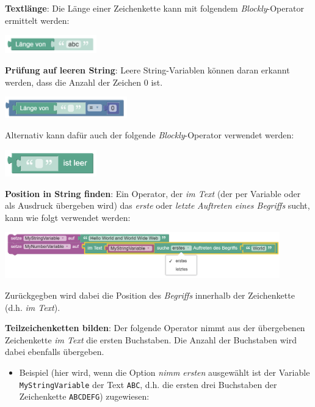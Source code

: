 \documentclass[
  letterpaper,
  DIV=11]{scrreprt}
\providecommand{\tightlist}{%
  \setlength{\itemsep}{0pt}\setlength{\parskip}{0pt}}\usepackage{longtable,booktabs,array}
\begin{document}
\begin{tcolorbox}
\textbf{Textlänge}: Die Länge einer Zeichenkette kann mit folgendem
\emph{Blockly}-Operator ermittelt werden:

\includegraphics[width=1.5625in,height=\textheight]{img/screenshot-blockly-text-length-operator-empty-01-DEU.png}

\textbf{Prüfung auf leeren String}: Leere String-Variablen können daran
erkannt werden, dass die Anzahl der Zeichen \(0\) ist.

\includegraphics[width=2.08333in,height=\textheight]{img/screenshot-blockly-text-is-empty-operator-empty-02-DEU.png}

Alternativ kann dafür auch der folgende \emph{Blockly}-Operator
verwendet werden:

\includegraphics[width=1.5625in,height=\textheight]{img/screenshot-blockly-text-is-empty-operator-empty-01-DEU.png}

\textbf{Position in String finden}: Ein Operator, der \emph{im Text}
(der per Variable oder als Ausdruck übergeben wird) das \emph{erste}
oder \emph{letzte} \emph{Auftreten eines Begriffs} sucht, kann wie folgt
verwendet werden:

\includegraphics[width=4.6875in,height=\textheight]{img/screenshot-blockly-text-find-operator-example-01-DEU.png}

Zurückgegben wird dabei die Position des \emph{Begriffs} innerhalb der
Zeichenkette (d.h. \emph{im Text}).

\textbf{Teilzeichenketten bilden}: Der folgende Operator nimmt aus der
übergebenen Zeichenkette \emph{im Text} die ersten Buchstaben. Die
Anzahl der Buchstaben wird dabei ebenfalls übergeben.

\begin{itemize}
\tightlist
\item
  Beispiel (hier wird, wenn die Option \emph{nimm ersten} ausgewählt ist
  der Variable \texttt{MyStringVariable} der Text \texttt{ABC}, d.h. die
  ersten drei Buchstaben der Zeichenkette \texttt{ABCDEFG}) zugewiesen:
\end{itemize}


\end{tcolorbox}
\end{document}

